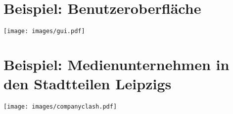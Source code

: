 \documentclass[a4paper, 
               12pt,
               DIV=calc,
               version=first,
               pdftex,
               headsepline,
               footsepline,
               bibtotocnumbered,
               liststotocnumbered]{scrreprt}
\begin{document}
\section{Beispiel: Benutzeroberfläche}
\label{sec:gui}
\centering
\texttt{[image: images/gui.pdf]}

\section{Beispiel: Medienunternehmen in den Stadtteilen Leipzigs}
\label{sec:companyclash}
\centering
\texttt{[image: images/companyclash.pdf]}


\listoftables
\listoffigures
\end{document}
